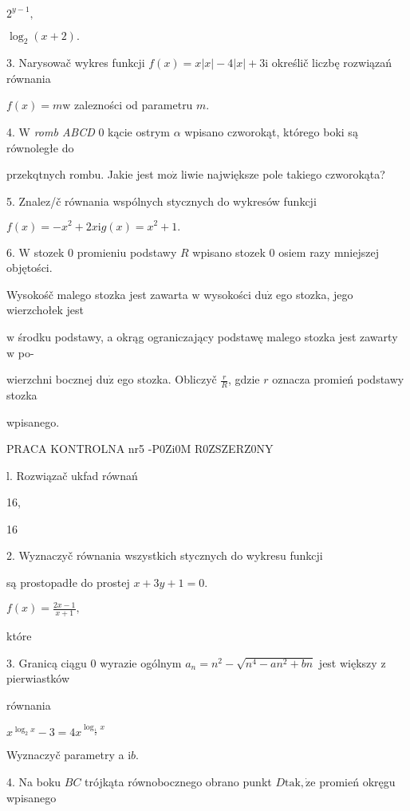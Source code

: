 \documentclass[a4paper,12pt]{article}
\begin{document}
$2^{y-1},$

$\log_{2}(x+2).$

3. Narysowač wykres funkcji $f(x) =x|x|-4|x|+3\mathrm{i}$ określič liczbę rozwiązań równania

$f(x)=m\mathrm{w}$ zalezności od parametru $m.$

4. $\mathrm{W}$ {\it romb ABCD} $0$ kącie ostrym $\alpha$ wpisano czworokąt, którego boki są równoległe do

przekqtnych rombu. Jakie jest $\mathrm{m}\mathrm{o}\dot{\mathrm{z}}$ liwie największe pole takiego czworokąta?

5. Znalez/č równania wspólnych stycznych do wykresów funkcji

$f(x)=-x^{2}+2x\mathrm{i}g(x)=x^{2}+1.$

6. $\mathrm{W}$ stozek $0$ promieniu podstawy $R$ wpisano stozek $0$ osiem razy mniejszej objętości.

Wysokośč malego stozka jest zawarta $\mathrm{w}$ wysokości $\mathrm{d}\mathrm{u}\dot{\mathrm{z}}$ ego stozka, jego wierzchołek jest

$\mathrm{w}$ środku podstawy, a okrąg ograniczający podstawę malego stozka jest zawarty $\mathrm{w}$ po-

wierzchni bocznej $\mathrm{d}\mathrm{u}\dot{\mathrm{z}}$ ego stozka. Obliczyč $\displaystyle \frac{r}{R}$, gdzie $r$ oznacza promień podstawy stozka

wpisanego.




PRACA KONTROLNA nr5 -P0Zi0M R0ZSZERZ0NY

l. Rozwiązač ukfad równań 

16,

16

2. Wyznaczyč równania wszystkich stycznych do wykresu funkcji

są prostopadłe do prostej $x+3y+1=0.$

$f(x) = \displaystyle \frac{2x-1}{x+1},$

które

3. Granicą ciągu $0$ wyrazie ogólnym $a_{n}=n^{2}-\sqrt{n^{4}-an^{2}+bn}$ jest większy $\mathrm{z}$ pierwiastków

równania

$x^{\log_{2}x}-3=4x^{\log_{\frac{1}{2}}x}$

Wyznaczyč parametry a $\mathrm{i}b.$

4. Na boku $BC$ trójkąta równobocznego obrano punkt $D\mathrm{t}\mathrm{a}\mathrm{k}, \dot{\mathrm{z}}\mathrm{e}$ promień okręgu wpisanego
\end{document}
